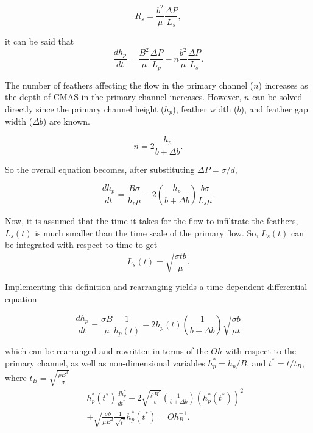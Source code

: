 \documentclass[%
 aip,
 amsmath,amssymb,
 reprint,%
]{revtex4-1}
\begin{document}
\begin{equation}
    R_{s} = \frac{b^{2}}{\mu}\frac{\Delta P}{L_{s}},
\end{equation}

\noindent it can be said that 
\begin{equation}
        \frac{dh_{p}}{dt} = \frac{B^{2}}{\mu}\frac{\Delta P}{L_{p}} -n\frac{b^{2}}{\mu}\frac{\Delta P}{L_{s}}.
\end{equation}

\noindent The number of feathers affecting the flow in the primary channel ($n$) increases as the depth of CMAS in the primary channel increases. However, $n$ can be solved directly since the primary channel height ($h_p$), feather width ($b$), and feather gap width ($\Delta b$) are known.

\begin{equation}
    n = 2\frac{h_{p}}{b + \Delta b}.
\end{equation}

\noindent So the overall equation becomes, after substituting $\Delta P = \sigma/d$,

\begin{equation}
    \frac{dh_{p}}{dt} = \frac{B \sigma}{h_{p}\mu} - 2\left(\frac{h_{p}}{b + \Delta b} \right)\frac{b \sigma}{L_{s}\mu}.
\end{equation}


\noindent Now, it is assumed that the time it takes for the flow to infiltrate the feathers, $L_{s}(t)$ is much smaller than the time scale of the primary flow. So, $L_{s}(t)$ can be integrated with respect to time to get 
\begin{equation}
    L_{s}\left( t \right) = \sqrt{\frac{\sigma t b}{\mu}}.
\end{equation}

\noindent Implementing this definition and rearranging yields a time-dependent differential equation

\begin{equation}
    \frac{dh_{p}}{dt} = \frac{\sigma B}{\mu} \frac{1}{h_{p}(t)} - 2h_{p}(t) \left( \frac{1}{b+\Delta b} \right) \sqrt{\frac{\sigma b}{\mu t}}
    \label{eq:FPNM_dimensional}
\end{equation}

\noindent which can be rearranged and rewritten in terms of the $Oh$ with respect to the primary channel, as well as non-dimensional variables $h_p^* = h_p/B$, and $t^* = t/t_{B}$, where $t_{B} = \sqrt{\frac{\rho B^{3}}{\sigma}}$
\begin{eqnarray}
\label{eq:FPNM_non-dimensional}
    &&h_{p}^{*}\left(t^{*}\right)\frac{dh_{p}^{*}}{dt^{*}} + 2\sqrt{\frac{\rho B^{3}}{\sigma}} \left( \frac{1}{b+\Delta b} \right)\left(h_{p}^{*}\left(t^{*}\right)\right)^{2} \\
    && + \sqrt{\frac{\sigma b}{\mu B^{2}}} \frac{1}{\sqrt{t^{*}}} h_{p}^{*} \left(t^{*}\right) = Oh_{B}^{-1}. \nonumber
\end{eqnarray}
\end{document}
